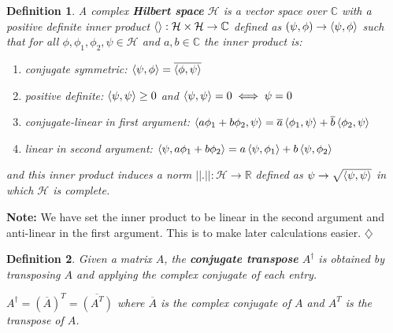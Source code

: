 \documentclass[12pt,twoside,fleqn]{report}
\theoremstyle{thmstyle}
\newtheorem{defn}{Definition}[chapter]
\newenvironment{note}{\textbf{Note:}}{\hfill\ensuremath{\diamondsuit}}
\begin{document}
\begin{samepage}
\begin{defn}
    A complex \textbf{Hilbert space} $\mathcal{H}$ is a vector space over $\mathbb{C}$ with a positive definite inner product $\braket{} : \mathcal{H} \times \mathcal{H} \to \mathbb{C}$ defined as $(\psi,\phi) \to \braket{\psi,\phi}$ such that for all $\phi, \phi_1, \phi_2, \psi \in \mathcal{H}$ and $a, b \in \mathbb{C}$ the inner product is:
    \begin{enumerate}
        \item conjugate symmetric: $\braket{\psi,\phi} = \overline{\braket{\phi,\psi}}$
        \item positive definite: $\braket{\psi, \psi} \geq 0$ and $\braket{\psi, \psi} = 0 \iff \psi = 0$
        \item conjugate-linear in first argument: $\braket{a \phi_1 + b \phi_2, \psi} = \overline{a} \braket{\phi_1, \psi} + \overline{b} \braket{\phi_2, \psi}$
        \item linear in second argument: $\braket{\psi, a \phi_1 + b \phi_2} = a \braket{\psi,\phi_1} + b \braket{\psi,\phi_2}$
    \end{enumerate}
    and this inner product induces a norm $||.|| : \mathcal{H} \to \mathbb{R}$ defined as $\psi \to \sqrt{\braket{\psi,\psi}}$ in which $\mathcal{H}$ is complete.
\end{defn}

\begin{note}
    We have set the inner product to be linear in the second argument and anti-linear in the first argument. This is to make later calculations easier.
\end{note}
\end{samepage}

\begin{defn}
    Given a matrix $A$, the \textbf{conjugate transpose} $A^\dagger$ is obtained by transposing $A$ and applying the complex conjugate of each entry.

    $A^\dagger = (\overline{A})^T = \overline{(A^T)}$ where $\overline{A}$ is the complex conjugate of $A$ and $A^T$ is the transpose of $A$.
\end{defn}
\end{document}
